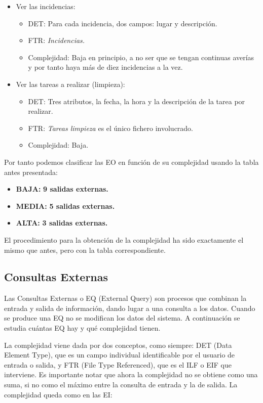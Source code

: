 \documentclass[spanish,a4paper,12pt]{report}	%
\begin{document}
\begin{itemize}
\begin{itemize}
		\end{itemize}
		\item{Ver las incidencias:} 
		\begin{itemize}
 			\item{DET:} Para cada incidencia, dos campos: lugar y descripción.
			\item{FTR:} \textit{Incidencias.}
			\item{Complejidad:} Baja en principio, a no ser que se tengan continuas averías y por tanto haya más de diez incidencias a la vez.
		\end{itemize}
		\item{Ver las tareas a realizar (limpieza):} 
		\begin{itemize}
 			\item{DET:} Tres atributos, la fecha, la hora y la descripción de la tarea por realizar.
			\item{FTR:} \textit{Tareas limpieza} es el único fichero involucrado.
			\item{Complejidad:} Baja.
		\end{itemize}	
	\end{itemize}

	Por tanto podemos clasificar las EO en función de su complejidad usando la tabla antes presentada:
	\begin{itemize}
	\item{\textbf{BAJA:}} \textbf{9 salidas externas.}
	\item{\textbf{MEDIA:}} \textbf{5 salidas externas.}
	\item{\textbf{ALTA:}} \textbf{3 salidas externas.}
	\end{itemize}

	El procedimiento para la obtención de la complejidad ha sido exactamente el mismo que antes, pero con la tabla correspondiente.

	\subsection{Consultas Externas}
	Las Consultas Externas o EQ (External Query) son procesos que combinan la entrada y salida de información, dando lugar a una consulta a los datos. Cuando se produce una EQ no se modifican los datos del sistema. A continuación se estudia cuántas EQ hay y qué complejidad tienen. 

	La complejidad viene dada por dos conceptos, como siempre: DET (Data Element Type), que es un campo individual identificable por el usuario de entrada o salida, y FTR (File Type Referenced), que es el ILF o EIF que interviene. Es importante notar que ahora la complejidad no se obtiene como una suma, si no como el máximo entre la consulta de entrada y la de salida. La complejidad queda como en las EI: 
\end{document}
